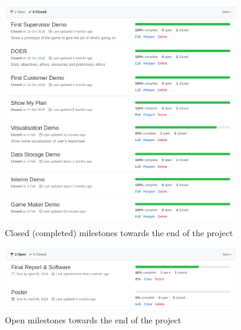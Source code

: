 \begin{figure}[!h]
	\centering
	\includegraphics[width=0.9\textwidth]{./images/softeng/closed_milestones.png}
	\caption{Closed (completed) milestones towards the end of the project}
	\label{fig:closed_milestones}
\end{figure}

\begin{figure}[!h]
	\centering
	\includegraphics[width=0.9\textwidth]{./images/softeng/open_milestones.png}
	\caption{Open milestones towards the end of the project}
	\label{fig:open_milestones}
\end{figure}


